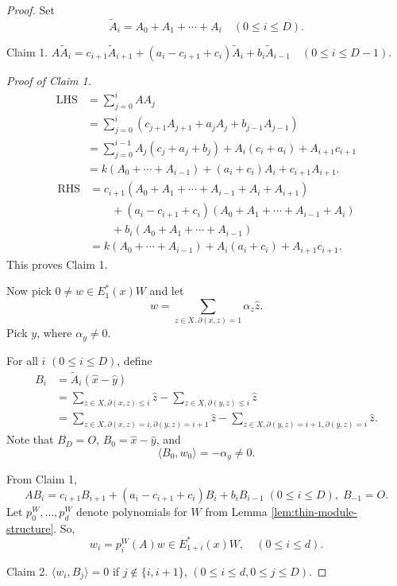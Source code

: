 \documentclass[
]{book}
\theoremstyle{definition}
\theoremstyle{definition}
\theoremstyle{definition}
\theoremstyle{definition}
\theoremstyle{remark}
\begin{document}
\begin{proof}
Set
\[\tilde{A}_i = A_0 + A_1 + \cdots + A_i \quad (0\leq i\leq D).\]

Claim 1. \(A\tilde{A}_i = c_{i+1}\tilde{A}_{i+1}+(a_i-c_{i+1}+c_i)\tilde{A}_i + b_i\tilde{A}_{i-1} \quad (0\leq i\leq D-1).\)

\emph{Proof of Claim 1.}
\begin{align}
\text{LHS} & = \sum_{j=0}^i AA_j\\
& = \sum_{j=0}^i (c_{j+1}A_{j+1} + a_jA_j + b_{j-1}A_{j-1})\\
& = \sum_{j=0}^{i-1}A_j(c_j+a_j+b_j) + A_i(c_i+a_i) + A_{i+1}c_{i+1}\\
& = k(A_0 + \cdots + A_{i-1}) + (a_i+c_i)A_i + c_{i+1}A_{i+1}.
\end{align}
\begin{align}
\text{RHS} & = c_{i+1}(A_0 + A_1 + \cdots + A_{i-1} + A_i + A_{i+1})\\
& \qquad + (a_i - c_{i+1}+c_i)(A_0 + A_1 + \cdots + A_{i-1} + A_i)\\
& \qquad + b_i(A_0 + A_1 + \cdots + A_{i-1})\\
& = k(A_0 + \cdots + A_{i-1}) + A_i(a_i + c_i) + A_{i+1}c_{i+1}.
\end{align}
This proves Claim 1.

Now pick \(0\neq w \in E^*_1(x)W\) and let
\[w = \sum_{z\in X, \partial(x,z)=1}\alpha_z\hat{z}.\]
Pick \(y\), where \(\alpha_y\neq 0\).

For all \(i\) \((0\leq i\leq D)\), define
\begin{align}
B_i & = \tilde{A}_i(\hat{x}- \hat{y})\\
& = \sum_{z\in X, \partial(x,z)\leq i}\hat{z} - \sum_{z\in X, \partial(y,z)\leq i} \hat{z}\\
& = \sum_{z\in X, \partial(x,z)=i, \partial(y,z)=i+1}\hat{z} - \sum_{z\in X, \partial(y,z)=i+1, \partial(y,z)=i} \hat{z}.
\end{align}
Note that \(B_D = O\), \(B_0 = \hat{x}-\hat{y}\), and
\[\langle B_0, w_0\rangle = -\alpha_y \neq 0.\]

From Claim 1,
\[AB_i = c_{i+1}B_{i+1}+(a_i-c_{i+1}+c_i)B_i + b_iB_{i-1} \; (0\leq i\leq D), \; B_{-1} = O.\]
Let \(p_0^W, \ldots, p^W_d\) denote polynomials for \(W\) from Lemma \ref{lem:thin-module-structure}. So,
\[w_i = p_i^W(A)w \in E^*_{1+i}(x)W, \quad (0\leq i\leq d).\]

Claim 2. \(\langle w_i, B_j \rangle = 0\) if \(j\not\in \{i, i+1\}\), \((0\leq i\leq d, 0\leq j\leq D)\).


\end{proof}
\end{document}
